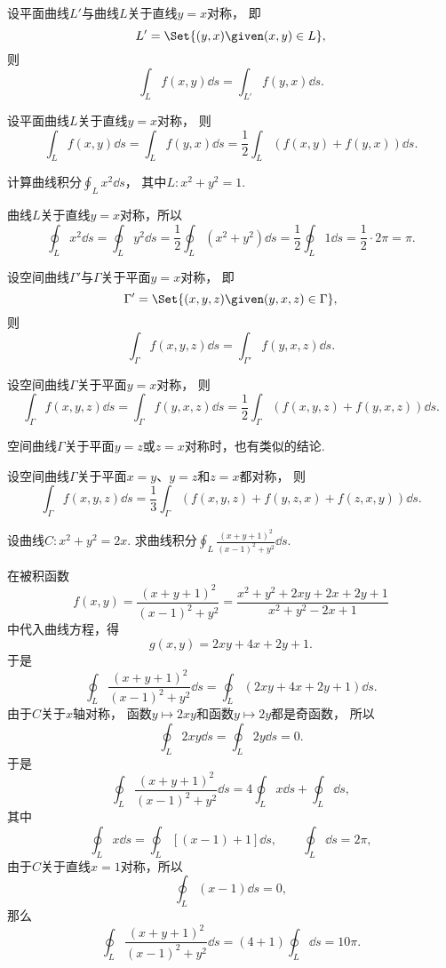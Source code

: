 
设平面曲线\(L'\)与曲线\(L\)关于直线\(y=x\)对称，
即\[
	L' = \Set{ (y,x) \given (x,y) \in L },
\]
则\[
	\int_L f(x,y) \dd{s}
	= \int_{L'} f(y,x) \dd{s}.
\]

设平面曲线\(L\)关于直线\(y=x\)对称，
则\[
	\int_L f(x,y) \dd{s}
	= \int_L f(y,x) \dd{s}
	= \frac12 \int_L (f(x,y) + f(y,x)) \dd{s}.
\]

\begin{example}
计算曲线积分\(\oint_L x^2 \dd{s}\)，
其中\(L: x^2+y^2=1\).
\begin{solution}
曲线\(L\)关于直线\(y=x\)对称，所以\[
	\oint_L x^2 \dd{s}
	= \oint_L y^2 \dd{s}
	= \frac12 \oint_L (x^2+y^2) \dd{s}
	= \frac12 \oint_L 1 \dd{s}
	= \frac12 \cdot 2\pi
	= \pi.
\]
\end{solution}
\end{example}

设空间曲线\(\Gamma'\)与\(\Gamma\)关于平面\(y=x\)对称，
即\[
	\Gamma' = \Set{ (x,y,z) \given (y,x,z) \in \Gamma },
\]
则\[
	\int_\Gamma f(x,y,z) \dd{s}
	= \int_{\Gamma'} f(y,x,z) \dd{s}.
\]

设空间曲线\(\Gamma\)关于平面\(y=x\)对称，
则\[
	\int_\Gamma f(x,y,z) \dd{s}
	= \int_\Gamma f(y,x,z) \dd{s}
	= \frac12 \int_\Gamma (f(x,y,z) + f(y,x,z)) \dd{s}.
\]

空间曲线\(\Gamma\)关于平面\(y=z\)或\(z=x\)对称时，也有类似的结论.

设空间曲线\(\Gamma\)关于平面\(x=y\)、\(y=z\)和\(z=x\)都对称，
则\[
	\int_\Gamma f(x,y,z) \dd{s}
	= \frac13 \int_\Gamma (f(x,y,z) + f(y,z,x) + f(z,x,y)) \dd{s}.
\]

\begin{example}
设曲线\(C: x^2+y^2=2x\).
求曲线积分\(\oint_L \frac{(x+y+1)^2}{(x-1)^2+y^2} \dd{s}\).
\begin{solution}
在被积函数\[
	f(x,y) = \frac{(x+y+1)^2}{(x-1)^2+y^2}
	= \frac{x^2+y^2+2xy+2x+2y+1}{x^2+y^2-2x+1}
\]中代入曲线方程，得\[
	g(x,y) = 2xy+4x+2y+1.
\]
于是\[
	\oint_L \frac{(x+y+1)^2}{(x-1)^2+y^2} \dd{s}
	= \oint_L (2xy+4x+2y+1) \dd{s}.
\]
由于\(C\)关于\(x\)轴对称，
函数\(y \mapsto 2xy\)和函数\(y \mapsto 2y\)都是奇函数，
所以\[
	\oint_L 2xy \dd{s}
	= \oint_L 2y \dd{s}
	= 0.
\]
于是\[
	\oint_L \frac{(x+y+1)^2}{(x-1)^2+y^2} \dd{s}
	= 4 \oint_L x \dd{s} + \oint_L \dd{s},
\]
其中\[
	\oint_L x \dd{s}
	= \oint_L [(x-1)+1] \dd{s},
	\qquad
	\oint_L \dd{s}
	= 2\pi,
\]
由于\(C\)关于直线\(x=1\)对称，所以\[
	\oint_L (x-1) \dd{s}
	= 0,
\]
那么\[
	\oint_L \frac{(x+y+1)^2}{(x-1)^2+y^2} \dd{s}
	= (4+1) \oint_L \dd{s}
	= 10\pi.
\]
\end{solution}
\end{example}


